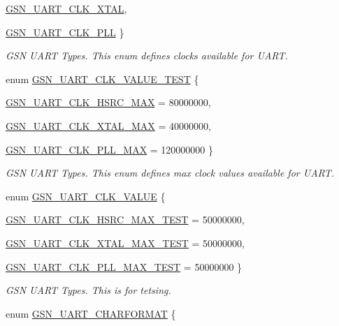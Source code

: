 \begin{DoxyCompactItemize}
\par
\hyperlink{a00656_ggad03ef3aa80077ad749fb3afd6e9a23afa1d81da573d0e3e03fc80556f37259ade}{GSN\_\-UART\_\-CLK\_\-XTAL}, 
\par
\hyperlink{a00656_ggad03ef3aa80077ad749fb3afd6e9a23afaef9b1aa51132e522ebac09fde4365171}{GSN\_\-UART\_\-CLK\_\-PLL}
 \}
\begin{DoxyCompactList}\small\item\em GSN UART Types. This enum defines clocks available for UART. \end{DoxyCompactList}\item 
enum \hyperlink{a00656_ga89a87c4e15500db4330f0d501e2068d1}{GSN\_\-UART\_\-CLK\_\-VALUE\_\-TEST} \{ \par
\hyperlink{a00656_gga89a87c4e15500db4330f0d501e2068d1a885613e521e568e810c02a17fc85a57e}{GSN\_\-UART\_\-CLK\_\-HSRC\_\-MAX} = 80000000, 
\par
\hyperlink{a00656_gga89a87c4e15500db4330f0d501e2068d1accc7ddada8dc3f8831f900813cd3f938}{GSN\_\-UART\_\-CLK\_\-XTAL\_\-MAX} = 40000000, 
\par
\hyperlink{a00656_gga89a87c4e15500db4330f0d501e2068d1a3473e1426adc27467ad37d0d25c187d6}{GSN\_\-UART\_\-CLK\_\-PLL\_\-MAX} = 120000000
 \}
\begin{DoxyCompactList}\small\item\em GSN UART Types. This enum defines max clock values available for UART. \end{DoxyCompactList}\item 
enum \hyperlink{a00656_ga7b923f8de1d1d52f2879a94bce534a31}{GSN\_\-UART\_\-CLK\_\-VALUE} \{ \par
\hyperlink{a00656_gga7b923f8de1d1d52f2879a94bce534a31a097ddadbe38e0dc576b793f0f2ed362e}{GSN\_\-UART\_\-CLK\_\-HSRC\_\-MAX\_\-TEST} = 50000000, 
\par
\hyperlink{a00656_gga7b923f8de1d1d52f2879a94bce534a31a3e1900763b065d501c46046e348883dc}{GSN\_\-UART\_\-CLK\_\-XTAL\_\-MAX\_\-TEST} = 50000000, 
\par
\hyperlink{a00656_gga7b923f8de1d1d52f2879a94bce534a31a8604aadfcb18657a8f04b8c5fe1302d1}{GSN\_\-UART\_\-CLK\_\-PLL\_\-MAX\_\-TEST} = 50000000
 \}
\begin{DoxyCompactList}\small\item\em GSN UART Types. This is for tetsing. \end{DoxyCompactList}\item 
enum \hyperlink{a00656_ga67767f968b0ccabbdd2c41c40f826e4e}{GSN\_\-UART\_\-CHARFORMAT} \{ \par

\end{DoxyCompactItemize}
